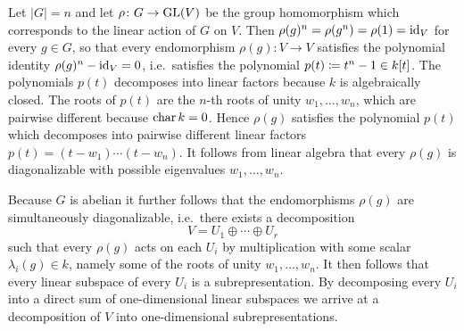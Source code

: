 \begin{example}
\begin{enumerate}
      Let $|G| = n$ and let $\rho \colon G \to \operatorname{GL}(V)$ be the group homomorphism which corresponds to the linear action of $G$ on $V$.
      Then $\rho(g)^n = \rho(g^n) = \rho(1) = \operatorname{id}_V$ for every $g \in G$, so that every endomorphism $\rho(g) \colon V \to V$ satisfies the polynomial identity $\rho(g)^n - \operatorname{id}_V = 0$, i.e.\ satisfies the polynomial $p(t) \coloneqq t^n - 1 \in k[t]$.
      The polynomials $p(t)$ decomposes into linear factors because $k$ is algebraically closed.
      The roots of $p(t)$ are the $n$-th roots of unity $w_1, \dotsc, w_n$, which are pairwise different because $\operatorname{char} k = 0$.
      Hence $\rho(g)$ satisfies the polynomial $p(t)$ which decomposes into pairwise different linear factors $p(t) = (t - w_1) \dotsm (t - w_n)$.
      It follows from linear algebra that every $\rho(g)$ is diagonalizable with possible eigenvalues $w_1, \dotsc, w_n$.
      
      Because $G$ is abelian it further follows that the endomorphisms $\rho(g)$ are simultaneously diagonalizable, i.e.\ there exists a decomposition
      \[
          V
        = U_1 \oplus \dotsb \oplus U_r
      \]
      such that every $\rho(g)$ acts on each $U_i$ by multiplication with some scalar $\lambda_i(g) \in k$, namely some of the roots of unity $w_1, \dotsc, w_n$.
      It then follows that every linear subspace of every $U_i$ is a subrepresentation.
      By decomposing every $U_i$ into a direct sum of one-dimensional linear subspaces we arrive at a decomposition of $V$ into one-dimensional subrepresentations.
  \end{enumerate}
\end{example}



